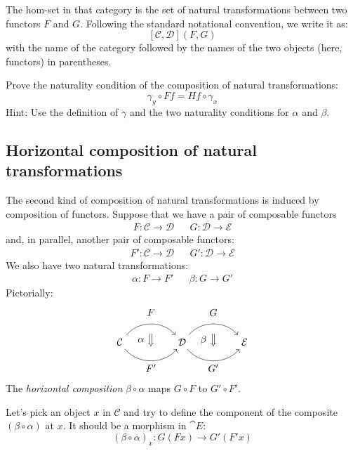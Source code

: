 \documentclass[DaoFP]{subfiles}
\begin{document}
The hom-set in that category is the set of natural transformations between two functors $F$ and $G$. Following the standard notational convention, we write it as:
\[ [\mathcal{C}, \mathcal{D}](F, G) \]
with the name of the category followed by the names of the two objects (here, functors) in parentheses.


\begin{exercise}
Prove the naturality condition of the composition of natural transformations:
\[ \gamma_y \circ F f = H f \circ \gamma_x \]
Hint: Use the definition of $\gamma$ and the two naturality conditions for $\alpha$ and $\beta$.
\end{exercise}

\subsection{Horizontal composition of natural transformations}

The second kind of composition of natural transformations is induced by composition of functors. Suppose that we have a pair of composable functors
\begin{align*}
 F \colon \mathcal{C} \to \mathcal{D}
&&G \colon \mathcal{D} \to \mathcal{E} 
\end{align*}
and, in parallel, another pair of composable functors:
\begin{align*}
 F' \colon \mathcal{C} \to \mathcal{D}
&& G' \colon \mathcal{D} \to \mathcal{E} 
\end{align*}
We also have two natural transformations:
\begin{align*}
\alpha \colon F \to F'  
&& \beta \colon G \to G' 
\end{align*}
Pictorially:
\[
\begin{tikzcd}[column sep=huge]
\mathcal{C}
  \arrow[bend left=50]{r}[name=U, label=above:$F$]{}
  \arrow[bend right=50]{r}[name=D, label=below:$F'$]{} 
 &
\mathcal{D}
  \arrow[bend left=50]{r}[name=U1, label=above:$G$]{}
  \arrow[bend right=50]{r}[name=D1, label=below:$G'$]{} 
 &
\mathcal{E}
  \arrow[shorten <=10pt,shorten >=10pt,Rightarrow,to path={(U) -- node[label=left:$\alpha$] {} (D)}]{}
  \arrow[shorten <=10pt,shorten >=10pt,Rightarrow,to path={(U1) -- node[label=left:$\beta$] {} (D1)}]{}
\end{tikzcd}
\]
The \emph{horizontal composition} $\beta \circ \alpha$ maps $G \circ F$ to $G' \circ F'$.

Let's pick an object $x$ in $\mathcal{C}$ and try to define the component of the composite $(\beta \circ \alpha)$ at $x$. It should be a morphism in $\cat E$:
\[ (\beta \circ \alpha)_x \colon G ( F x) \to G' ( F' x) \]
\end{document}
